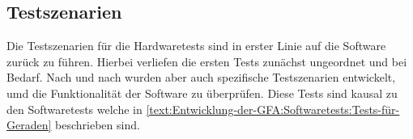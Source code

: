 \subsection{Testszenarien}

Die Testszenarien für die Hardwaretests sind in erster Linie auf die Software zurück zu führen. Hierbei verliefen die ersten Tests zunächst ungeordnet und bei Bedarf. Nach und nach wurden aber auch spezifische Testszenarien entwickelt, umd die Funktionalität der Software zu überprüfen. Diese Tests sind kausal zu den Softwaretests welche in \autoref{text:Entwicklung-der-GFA:Softwaretests:Tests-für-Geraden}  beschrieben sind.
